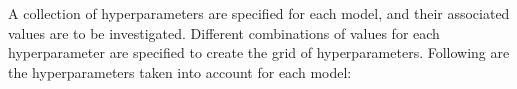 \documentclass[a4paper,12pt]{report}%
\renewcommand{\\}{\vspace*{0.5\baselineskip} \newline}
\begin{document}
\noindent A collection of hyperparameters are specified for each model, and their associated values are to be investigated. Different combinations of values for each hyperparameter are specified to create the grid of hyperparameters. Following are the hyperparameters taken into account for each model:
\end{document}
